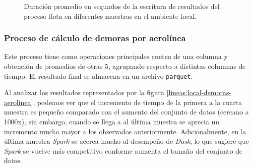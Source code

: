 \begin{figure}
\centering
{}
\caption{Duración promedio en segundos de la escritura de resultados del proceso flota en diferentes muestras en el ambiente local.}
\label{lineas:local-flota-write}
\end{figure}

\subsubsection{Proceso de cálculo de demoras por aerolínea}

Este proceso tiene como operaciones principales conteo de una columna y obtención de promedios de otras 5, agrupando respecto a distintas columnas de tiempo. El resultado final se almacena en un archivo \texttt{parquet}.

Al analizar los resultados representados por la figura \ref{lineas:local-demoras-aerolinea}, podemos ver que el incremento de tiempo de la primera a la cuarta muestra es pequeño comparado con el aumento del conjunto de datos (cercano a 1000x), sin embargo, cuando se llega a al última muestra se aprecia un incremento mucho mayor a los observados anteriormente. Adicionalmente, en la última muestra \textit{Spark} se acerca mucho al desempeño de \textit{Dask}, lo que sugiere que \textit{Spark} se vuelve más competitivo conforme aumenta el tamaño del conjunto de datos. 

